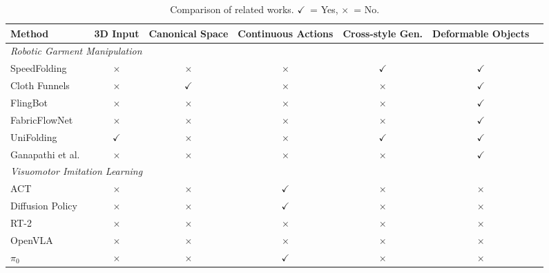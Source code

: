 \begin{table}[ht]
\centering
\caption{Comparison of related works. $\checkmark$~= Yes, $\times$~= No.}
\label{tab:related_works}
\renewcommand{\arraystretch}{1.2}
\setlength{\tabcolsep}{6pt}
\begin{tabular}{lcccccc}
\toprule
\textbf{Method} & \textbf{3D Input} & \textbf{Canonical Space} & \textbf{Continuous Actions} & \textbf{Cross-style Gen.} & \textbf{Deformable Objects} \\
\midrule
\multicolumn{6}{l}{\textit{Robotic Garment Manipulation}} \\
\midrule
SpeedFolding~\cite{avigal2022speedfolding}                              & $\times$ & $\times$     & $\times$     & $\checkmark$ & $\checkmark$ \\
Cloth Funnels~\cite{canberk2022clothfunnelscanonicalizedalignmentmultipurpose} & $\times$ & $\checkmark$ & $\times$     & $\times$     & $\checkmark$ \\
FlingBot~\cite{DBLP:journals/corr/abs-2105-03655}                       & $\times$ & $\times$     & $\times$     & $\times$     & $\checkmark$ \\
FabricFlowNet~\cite{weng2022fabricflownet}                              & $\times$ & $\times$     & $\times$     & $\times$     & $\checkmark$ \\
UniFolding~\cite{unifolding2023}                                        & $\checkmark$ & $\times$  & $\times$     & $\checkmark$ & $\checkmark$ \\
Ganapathi et al.~\cite{ganapathi2020learningdensevisualcorrespondences} & $\times$ & $\times$     & $\times$     & $\times$     & $\checkmark$ \\
\midrule
\multicolumn{6}{l}{\textit{Visuomotor Imitation Learning}} \\
\midrule
ACT~\cite{zhao2023act}                          & $\times$ & $\times$ & $\checkmark$ & $\times$     & $\times$ \\
Diffusion Policy~\cite{chi2023diffusionpolicy}  & $\times$ & $\times$ & $\checkmark$ & $\times$     & $\times$ \\
RT-2~\cite{brohan2023rt2visionlanguageactionmodelstransfer} & $\times$ & $\times$ & $\times$ & $\times$  & $\times$ \\
OpenVLA~\cite{kim2024openvlaopensourcevisionlanguageactionmodel} & $\times$ & $\times$ & $\times$ & $\times$ & $\times$ \\
$\pi_0$~\cite{black2026pi0visionlanguageactionflowmodel} & $\times$ & $\times$ & $\checkmark$ & $\times$ & $\times$ \\

\end{tabular}
\end{table}
